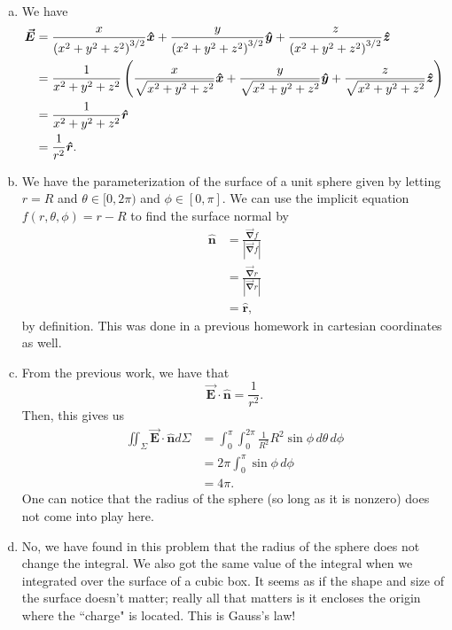 \documentclass[12pt]{article} %
\newcommand{\grad}{\boldsymbol{\vec{\nabla}}}
\newcommand{\vecfieldE}{\boldsymbol{\vec{E}}}
\newcommand{\rhat}{\boldsymbol{\hat{r}}}
\newcommand{\unitvec}{\boldsymbol{\hat{n}}}
\begin{document}
\begin{solution}~
\begin{enumerate}[(a)]
    \item We have
    \begin{align*}
    \vecfieldE &= \frac{x}{\left(x^2+y^2+z^2\right)^{3/2}} \xhat + \frac{y}{\left(x^2+y^2+z^2\right)^{3/2}} \yhat + \frac{z}{\left(x^2+y^2+z^2\right)^{3/2}} \zhat\\
     &= \frac{1}{x^2+y^2+z^2} \left( \frac{x}{\sqrt{x^2+y^2+z^2}} \xhat + \frac{y}{\sqrt{x^2+y^2+z^2}} \yhat + \frac{z}{\sqrt{x^2+y^2+z^2}} \zhat\right)\\
     &= \frac{1}{x^2+y^2+z^2} \rhat\\
     &= \frac{1}{r^2} \rhat.
    \end{align*}
    \item We have the parameterization of the surface of a unit sphere given by letting $r=R$ and $\theta \in [0,2\pi)$ and $\phi \in [0,\pi]$. We can use the implicit equation $f(r,\theta,\phi)=r-R$ to find the surface normal by
    \begin{align*}
        \unitvec &= \frac{\grad f}{\left| \grad f \right|} \\
        &= \frac{\grad r}{\left|\grad r\right|}\\
        &= \rhat,
    \end{align*}
    by definition. This was done in a previous homework in cartesian coordinates as well.
    \item From the previous work, we have that
    \[
    \vecfieldE \cdot \unitvec = \frac{1}{r^2}.  
    \]
    Then, this gives us
    \begin{align*}
        \iint_{\Sigma} \vecfieldE \cdot \unitvec d\Sigma &= \int_0^\pi \int_0^{2\pi} \frac{1}{R^2} R^2 \sin \phi  \, d\theta \, d\phi \\
        &= 2\pi \int_0^\pi \sin \phi \, d \phi\\
        &= 4 \pi.  
    \end{align*}
    One can notice that the radius of the sphere (so long as it is nonzero) does not come into play here. 
\item No, we have found in this problem that the radius of the sphere does not change the integral. We also got the same value of the integral when we integrated over the surface of a cubic box. It seems as if the shape and size of the surface doesn't matter; really all that matters is it encloses the origin where the ``charge" is located. This is Gauss's law!
\end{enumerate} 
\end{solution}
\end{document}
